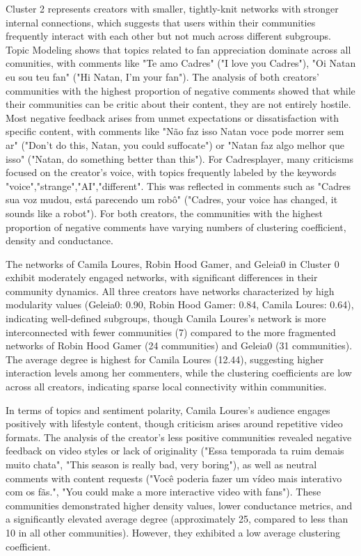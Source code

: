 \documentclass[12pt]{article}
\begin{document}
Cluster 2 represents creators with smaller, tightly-knit networks with stronger internal connections,
which suggests that users within their communities frequently interact with each other but not much across
different subgroups. Topic Modeling shows that topics related to fan appreciation dominate across 
all comunities, with comments like "Te amo Cadres" ("I love you Cadres"), "Oi Natan eu sou teu fan"
("Hi Natan, I'm your fan"). 
The analysis of both creators' communities with the highest proportion of negative comments showed that
while their communities can be critic about their content, they are not entirely hostile.
Most negative feedback arises from unmet expectations or dissatisfaction with specific content, 
with comments like "Não faz isso Natan voce pode morrer sem ar" ("Don't do this, Natan, you could suffocate")
or "Natan faz algo melhor que isso" ("Natan, do something better than this"). 
For Cadresplayer, many criticisms focused on the creator's voice, with topics frequently labeled by
the keywords "voice","strange","AI","different". This was reflected in comments such as "Cadres sua voz 
mudou, está parecendo um robô" ("Cadres, your voice has changed, it sounds like a robot").
For both creators, the communities with the highest proportion of negative comments have varying numbers
of clustering coefficient, density and conductance.

The networks of Camila Loures, Robin Hood Gamer, and Geleia0 in Cluster 0 exhibit 
moderately engaged networks, with significant differences in their community dynamics. 
All three creators have networks characterized by high modularity values (Geleia0: 0.90, Robin Hood Gamer: 
0.84, Camila Loures: 0.64), indicating well-defined subgroups, though Camila Loures’s network is 
more interconnected with fewer communities (7) compared to the more fragmented networks of Robin Hood Gamer 
(24 communities) and Geleia0 (31 communities). 
The average degree is highest for Camila Loures (12.44), suggesting higher 
interaction levels among her commenters, while the clustering coefficients are low across all creators, 
indicating sparse local connectivity within communities. 

In terms of topics and sentiment polarity, Camila Loures's 
audience engages positively with lifestyle content, though criticism arises around repetitive 
video formats.
The analysis of the creator's less positive communities revealed negative feedback on 
video styles or lack of originality ("Essa temporada ta ruim demais muito chata", "This season is really bad, very boring"), 
as well as neutral comments with content requests ("Você poderia fazer um vídeo mais interativo com os fãs.", 
"You could make a more interactive video with fans").
These communities demonstrated higher density values, lower conductance metrics, and a significantly 
elevated average degree (approximately 25, compared to less than 10 in all other communities). 
However, they exhibited a low average clustering coefficient.
\end{document}
